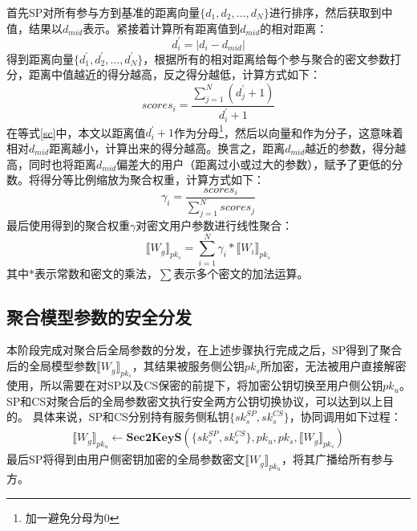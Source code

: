 首先SP对所有参与方到基准的距离向量$\{d_1, d_2,...,d_N\}$进行排序，然后获取到中值，结果以$d_{mid}$表示。紧接着计算所有距离值到$ d_{mid} $的相对距离：
\begin{equation}\label{dToMid}
	d^{\prime}_{i}=\left|d_i-d_{mid}\right|
\end{equation}
得到距离向量$\{d^{\prime}_1, d^{\prime}_2,...,d^{\prime}_N\}$，根据所有的相对距离给每个参与聚合的密文参数打分，距离中值越近的得分越高，反之得分越低，计算方式如下：
\begin{equation}\label{sc}
	scores_i=\frac{\sum_{j=1}^{N} (d^{\prime}_{j} + 1)}{d^{\prime}_i + 1}
\end{equation}
在等式\ref{sc}中，本文以距离值$d^{\prime}_i + 1$作为分母\footnote{加一避免分母为0}，然后以向量和作为分子，这意味着相对$d_{mid}$距离越小，计算出来的得分越高。换言之，距离$d_{mid}$越近的参数，得分越高，同时也将距离$d_{mid}$偏差大的用户（距离过小或过大的参数），赋予了更低的分数。将得分等比例缩放为聚合权重，计算方式如下：
\begin{equation}
	\gamma_i=\dfrac{scores_i}{\sum_{j=1}^{N} scores_j}
\end{equation}
最后使用得到的聚合权重$\gamma$对密文用户参数进行线性聚合：
\begin{equation}\label{e3}
	\llbracket W_g\rrbracket_{pk_s}=\sum_{i=1}^{N}\gamma_i*\llbracket W_i\rrbracket_{pk_s}
\end{equation}
其中$*$表示常数和密文的乘法，$\sum$表示多个密文的加法运算。

\subsection{聚合模型参数的安全分发}\label{broadcast-para}
本阶段完成对聚合后全局参数的分发，在上述步骤执行完成之后，SP得到了聚合后的全局模型参数$ \llbracket W_g\rrbracket_{pk_s} $，其结果被服务侧公钥$pk_s$所加密，无法被用户直接解密使用，所以需要在对SP以及CS保密的前提下，将加密公钥切换至用户侧公钥$pk_u$。
SP和CS对聚合后的全局参数密文执行安全两方公钥切换协议，可以达到以上目的。
具体来说，SP和CS分别持有服务侧私钥$\{sk_s^{SP}, sk_s^{CS}\}$，协同调用如下过程：
	\begin{equation}\label{e4}
		\begin{aligned}
			\llbracket W_g\rrbracket_{pk_u} \leftarrow \textbf{Sec2KeyS}(\{sk_s^{SP}, sk_s^{CS}\}, pk_u, pk_s, \llbracket W_g\rrbracket_{pk_s})
		\end{aligned}
	\end{equation}
最后SP将得到由用户侧密钥加密的全局参数密文$\llbracket W_g\rrbracket_{pk_u}$，将其广播给所有参与方。

